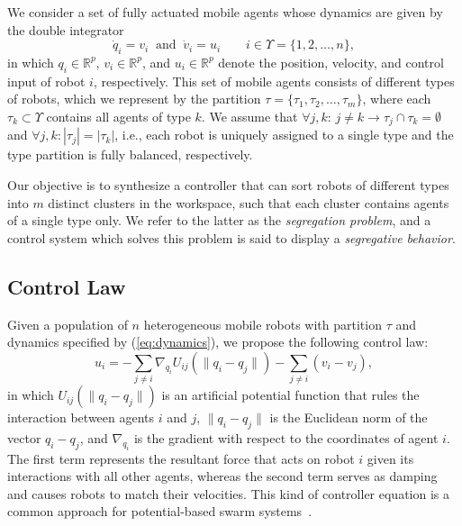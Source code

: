 \documentclass[letterpaper, 10 pt, conference]{ieeeconf}  %
\newcommand{\norm}[1]{\lVert#1\rVert}
\begin{document}
We consider a set of fully actuated mobile agents whose dynamics are
given by the double integrator
\begin{equation}
  \label{eq:dynamics}
  \dot{q}_i = v_i \;\;\text{and}\;\; \dot{v}_i = u_i \hspace{2em} i \in \Upsilon = \{1,2,\dots,n\},
\end{equation}
in which $q_i \in \mathbb{R}^p$, $v_i \in \mathbb{R}^p$, and $u_i \in
\mathbb{R}^p$ denote the position, velocity, and control input of
robot $i$, respectively. This set of mobile agents consists of
different types of robots, which we represent by the partition $\tau =
\{\tau_1,\tau_2,\dots,\tau_m \}$, where each $\tau_k \subset \Upsilon$
contains all agents of type $k$. We assume that $\forall j,k: \, j
\neq k \to \tau_j \cap \tau_k = \emptyset$ and $\forall
j,k:|\tau_j|=|\tau_k|$, i.e., each robot is uniquely assigned to a
single type and the type partition is fully balanced, respectively.

Our objective is to synthesize a controller that can sort robots of different
types into $m$ distinct clusters in the workspace, such that each
cluster contains agents of a single type only. We refer to the latter
as the \textit{segregation problem}, and a control system which solves
this problem is said to display a \textit{segregative behavior}.

\subsection{Control Law}

Given a population of $n$ heterogeneous mobile robots with partition
$\tau$ and dynamics specified by (\ref{eq:dynamics}), we propose the
following control law:
\begin{equation}
  \label{eq:controller}
  u_i = - \sum_{j \neq i} \nabla_{q_i} U_{ij}(\norm{q_i - q_j}) - \sum_{j \neq i} (v_i - v_j),
\end{equation}
in which $U_{ij}(\norm{q_i-q_j})$ is an artificial potential function
that rules the interaction between agents $i$ and $j$,
$\norm{q_i-q_j}$ is the Euclidean norm of the vector $q_i-q_j$, and
$\nabla_{q_i}$ is the gradient with respect to the coordinates of
agent $i$. The first term represents the resultant force that acts on
robot $i$ given its interactions with all other agents, whereas the
second term serves as damping and causes robots to match their
velocities. This kind of controller equation is a common approach for
potential-based swarm
systems~\cite{Kumar:10,Leonard:01,Olfati-Saber:06}.
\end{document}
